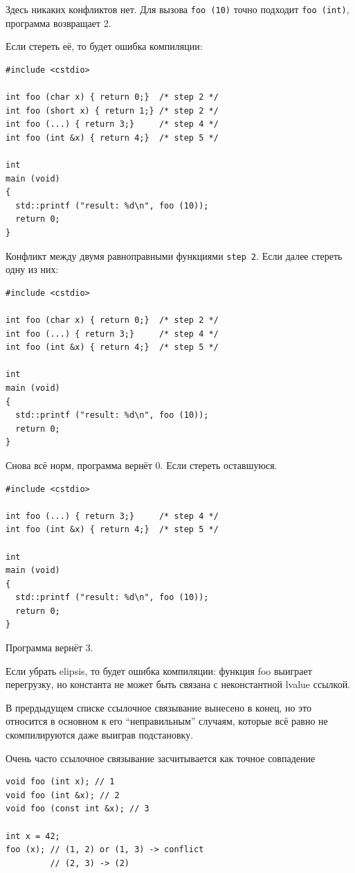 \documentclass[a4paper,12pt,oneside]{article}
\begin{document}
Здесь никаких конфликтов нет. Для вызова \lstinline!foo (10)! точно подходит \lstinline!foo (int)!, программа возвращает 2.

Если стереть её, то будет ошибка компиляции:

\begin{lstlisting}
#include <cstdio>

int foo (char x) { return 0;}  /* step 2 */
int foo (short x) { return 1;} /* step 2 */
int foo (...) { return 3;}     /* step 4 */
int foo (int &x) { return 4;}  /* step 5 */

int
main (void)
{
  std::printf ("result: %d\n", foo (10));
  return 0;
}
\end{lstlisting}

Конфликт между двумя равноправными функциями \lstinline!step 2!. Если далее стереть одну из них:

\begin{lstlisting}
#include <cstdio>

int foo (char x) { return 0;}  /* step 2 */
int foo (...) { return 3;}     /* step 4 */
int foo (int &x) { return 4;}  /* step 5 */

int
main (void)
{
  std::printf ("result: %d\n", foo (10));
  return 0;
}
\end{lstlisting}

Снова всё норм, программа вернёт 0. Если стереть оставшуюся.

\begin{lstlisting}
#include <cstdio>

int foo (...) { return 3;}     /* step 4 */
int foo (int &x) { return 4;}  /* step 5 */

int
main (void)
{
  std::printf ("result: %d\n", foo (10));
  return 0;
}
\end{lstlisting}

Программа вернёт 3. 

Если убрать elipsis, то будет ошибка компиляции: функция foo выиграет перегрузку, но константа не может быть связана с неконстантной lvalue ссылкой.

В прердыдущем списке ссылочное связывание вынесено в конец, но это относится в основном к его ``неправильным'' случаям, которые всё равно не скомпилируются даже выиграв подстановку.

Очень часто ссылочное связывание засчитывается как точное совпадение

\begin{lstlisting}
void foo (int x); // 1
void foo (int &x); // 2
void foo (const int &x); // 3

int x = 42;
foo (x); // (1, 2) or (1, 3) -> conflict 
         // (2, 3) -> (2) 
\end{lstlisting}
\end{document}
